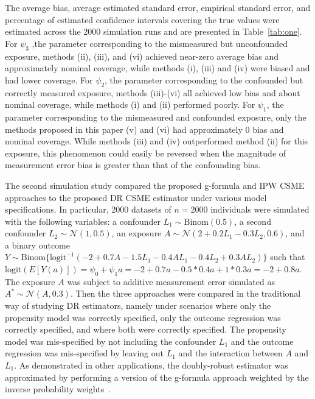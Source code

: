 \documentclass[useAMS,usenatbib,referee]{biom}
\begin{document}
The average bias, average estimated standard error, empirical standard error, and percentage of estimated confidence intervals covering the true values were estimated across the 2000 simulation runs and are presented in Table~\ref{tab:one}. For $\psi_{3}$ ,the parameter corresponding to the mismeasured but unconfounded exposure, methods (ii), (iii), and (vi) achieved near-zero average bias and approximately nominal coverage, while methods (i), (iii) and (iv) were biased and had lower coverage. For $\psi_{2}$, the parameter corresponding to the confounded but correctly measured exposure, methods (iii)-(vi) all achieved low bias and about nominal coverage, while methods (i) and (ii) performed poorly. For $\psi_{1}$, the parameter corresponding to the mismeasured and confounded exposure, only the methods proposed in this paper (v) and (vi) had approximately 0 bias and nominal coverage. While methods (iii) and (iv) outperformed method (ii) for this exposure, this phenomenon could easily be reversed when the magnitude of measurement error bias is greater than that of the confounding bias.

The second simulation study compared the proposed g-formula and IPW CSME approaches to the proposed DR CSME estimator under various model specifications. In particular, 2000 datasets of $n = 2000$ individuals were simulated with the following variables: a confounder $L_{1} \sim \text{Binom}(0.5)$, a second confounder $L_{2} \sim \mathcal{N}(1, 0.5)$, an exposure $A \sim \mathcal{N}(2 + 0.2L_{1} - 0.3L_{2}, 0.6)$, and a binary outcome $Y \sim \text{Binom}\{ \text{logit}^{-1}(-2 + 0.7A - 1.5L_{1} - 0.4AL_{1} -0.4L_{2} + 0.3AL_{2}) \}$ such that $\text{logit}(E[Y(a)]) = \psi_{0} + \psi_{1}a = -2 + 0.7a - 0.5*0.4a + 1*0.3a = -2 + 0.8a$. The exposure $A$ was subject to additive measurement error simulated as $A^{*} \sim \mathcal{N}(A, 0.3)$. Then the three approaches were compared in the traditional way of studying DR estimators, namely under scenarios where only the propensity model was correctly specified, only the outcome regression was correctly specified, and where both were correctly specified. The propensity model was mis-specified by not including the confounder $L_{1}$ and the outcome regression was mis-specified by leaving out $L_{1}$ and the interaction between $A$ and $L_{1}$. As demonstrated in other applications, the doubly-robust estimator was approximated by performing a version of the g-formula approach weighted by the inverse probability weights~\citep{hirano2001}.
\end{document}
